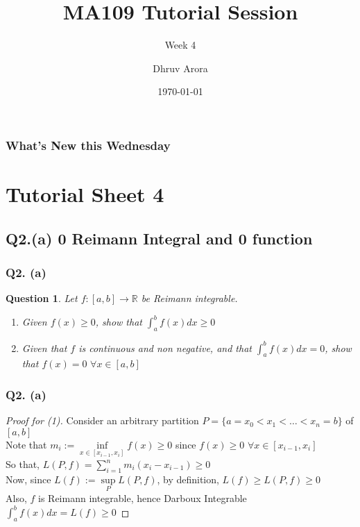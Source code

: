 \documentclass[aspectratio=169]{beamer}
\title{MA109 Tutorial Session}
\subtitle{Week 4}
\author{Dhruv Arora}
\institute{Sophomore, Dept of CSE}
\date{\today}
\newtheorem{qsn}{Question}
\newcommand{\bR}{\mathbb{R}}
\begin{document}
\begin{frame}[plain]
\titlepage
\end{frame}

\begin{frame}[plain]
\frametitle{What's New this Wednesday}
\tableofcontents
\end{frame}

\section{Tutorial Sheet 4}

\subsection{Q2.(a) 0 Reimann Integral and 0 function}

\begin{frame}
\frametitle{Q2. (a)}
\pause
\begin{qsn}
Let $f:[a,b]\to\bR$ be Reimann integrable.\pause
\begin{enumerate}
\item Given $f(x)\geqslant 0$, show that $\int_a^b f(x)dx \geqslant 0$\pause
\item Given that $f$ is continuous and non negative, and that $\int_a^b f(x)dx = 0$, show that $f(x)=0 \,\,\forall x \in [a,b]$
\end{enumerate}
\end{qsn}
\end{frame}

\begin{frame}
\frametitle{Q2. (a)}
\begin{proof}[Proof for (1)]
\pause
Consider an arbitrary partition $P = \{a = x_0<x_1<\dots < x_n = b\}$ of $[a,b]$\\ \pause
Note that $m_i := \inf\limits_{x\in [x_{i-1},x_i]} f(x) \geqslant 0$ since $f(x)\geqslant 0 \,\,\forall x \in [x_{i-1},x_i]$ \\ \pause
So that, $L(P,f) = \sum\limits_{i=1}^n m_i(x_i-x_{i-1}) \geqslant 0$ \\ \pause
Now, since $L(f) := \sup\limits_{P} L(P,f)$, by definition, $L(f)\geqslant L(P,f) \geqslant 0$ \\ \pause
Also, $f$ is Reimann integrable, hence Darboux Integrable \\ \pause
$\int_a^b f(x)dx = L(f) \geqslant 0$
\end{proof}
\end{frame}
\end{document}
